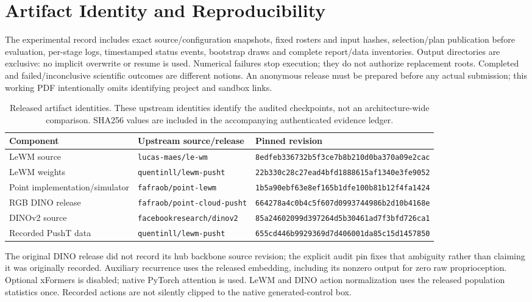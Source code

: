 \section{Artifact Identity and Reproducibility}
\label{app:artifacts}

The experimental record includes exact source/configuration snapshots, fixed
rosters and input hashes, selection/plan publication before evaluation, per-stage
logs, timestamped status events, bootstrap draws and complete report/data
inventories. Output directories are exclusive: no implicit overwrite or resume
is used. Numerical failures stop execution; they do not authorize replacement
roots. Completed and failed/inconclusive scientific outcomes are different
notions. An anonymous release must be prepared before any actual submission;
this working PDF intentionally omits identifying project and sandbox links.

\begin{table}[h]
\caption{Released artifact identities. These upstream identities identify the
audited checkpoints, not an architecture-wide comparison. SHA256 values are
included in the accompanying authenticated evidence ledger.}
\centering\small
\begingroup
\setlength{\tabcolsep}{3pt}
\begin{tabular}{lll}
\toprule
Component & Upstream source/release & Pinned revision \\
\midrule
LeWM source & \texttt{lucas-maes/le-wm} & \texttt{8edfeb336732b5f3ce7b8b210d0ba370a09e2cac} \\
LeWM weights & \texttt{quentinll/lewm-pusht} & \texttt{22b330c28c27ead4bfd1888615af1340e3fe9052} \\
Point implementation/simulator & \texttt{fafraob/point-lewm} & \texttt{1b5a90ebf63e8ef165b1dfe100b81b12f4fa1424} \\
RGB DINO release & \texttt{fafraob/point-cloud-pusht} & \texttt{664278a4c0b4c5f607d0993744986b2d10b4168e} \\
DINOv2 source & \texttt{facebookresearch/dinov2} & \texttt{85a24602099d397264d5b30461ad7f3bfd726ca1} \\
Recorded PushT data & \texttt{quentinll/lewm-pusht} & \texttt{655cd446b9929369d7d406001da85c15d1457850} \\
\bottomrule
\end{tabular}
\endgroup
\end{table}

The original DINO release did not record its hub backbone source revision; the
explicit audit pin fixes that ambiguity rather than claiming it was originally
recorded. Auxiliary recurrence uses the released embedding, including its
nonzero output for zero raw proprioception. Optional xFormers is disabled;
native PyTorch attention is used. LeWM and DINO action normalization uses the
released population statistics once. Recorded actions are not silently clipped
to the native generated-control box.

